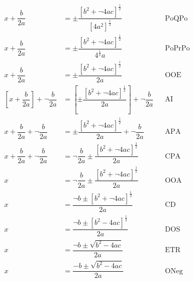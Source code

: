 \begin{align*}
x+ \dfrac{b}{2a}  &=\pm \dfrac{\left[b^2+ \neg 4ac \right]^{\frac{1}{2}}}{\left[4a^2\right]^{\frac{1}{2}}} && \text{PoQPo}\\
x+ \dfrac{b}{2a}  &=\pm \dfrac{\left[b^2+ \neg 4ac \right]^{\frac{1}{2}}}{4^{\frac{1}{2}} a} && \text{PoPrPo}\\
x+ \dfrac{b}{2a}  &=\pm \dfrac{\left[b^2+ \neg 4ac \right]^{\frac{1}{2}}}{2a} && \text{OOE}\\
\left[x+ \dfrac{b}{2a}\right] +  \neg   \dfrac{b}{2a} &= \left[\pm\dfrac{\left[b^2+ \neg 4ac \right]^{\frac{1}{2}}}{2a}\right] + \neg \dfrac{b}{2a} && \text{AI}\\
x+ \dfrac{b}{2a} +  \neg   \dfrac{b}{2a} &= \pm\dfrac{\left[b^2+ \neg 4ac \right]^{\frac{1}{2}}}{2a} + \neg \dfrac{b}{2a} && \text{APA}\\
x+ \dfrac{b}{2a} + \neg   \dfrac{b}{2a} &=\neg   \dfrac{b}{2a} \pm\dfrac{\left[b^2+ \neg 4ac \right]^{\frac{1}{2}}}{2a} && \text{CPA}\\
x &=\neg   \dfrac{b}{2a}  \pm\dfrac{\left[b^2+ \neg 4ac \right]^{\frac{1}{2}}}{2a} && \text{OOA}\\
x &= \dfrac{\neg  b  \pm {\left[b^2+ \neg 4ac \right]^{\frac{1}{2}}}}{2a} && \text{CD}\\
x &= \dfrac{\neg  b  \pm {\left[b^2 - 4ac \right]^{\frac{1}{2}}}}{2a} && \text{DOS}\\
x &= \dfrac{\neg  b  \pm {\sqrt{b^2 - 4ac}}}{2a} && \text{ETR}\\
x &= \dfrac{-  b  \pm {\sqrt{b^2 - 4ac}}}{2a} && \text{ONeg}
\end{align*}
